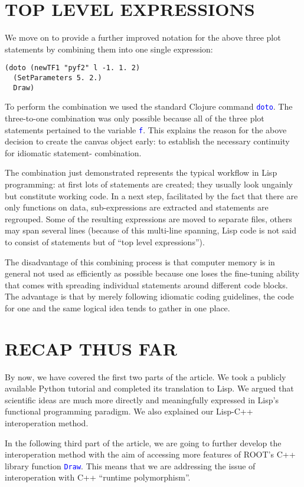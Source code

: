\documentclass{IEEEcsmag}
\begin{document}
\section{TOP LEVEL EXPRESSIONS}
We move on to provide a further improved notation for the above three plot statements by combining them into one single expression:
{\color{blue} \begin{verbatim}
(doto (newTF1 "pyf2" l -1. 1. 2)
  (SetParameters 5. 2.)
  Draw)
\end{verbatim}}
To perform the combination we used the standard Clojure command \texttt{\textcolor{blue}{doto}}. The three-to-one combination was only possible because all of the three plot statements pertained to the variable \texttt{\textcolor{blue}{f}}. This explains the reason for the above decision to create the canvas object early: to establish the necessary continuity for idiomatic statement- combination.

The combination just demonstrated represents the typical workflow in Lisp programming: at first lots of statements are created; they usually look ungainly but constitute working code. In a next step, facilitated by the fact that there are only functions on data, sub-expressions are extracted and statements are regrouped. Some of the resulting expressions are moved to separate files, others may span several lines (because of this multi-line spanning, Lisp code is not said to consist of statements but of “top level expressions”).

The disadvantage of this combining process is that computer memory is in general not used as efficiently as possible because one loses the fine-tuning ability that comes with spreading individual statements around different code blocks. The advantage is that by merely following idiomatic coding guidelines, the code for one and the same logical idea tends to gather in one place.\vspace*{-5pt}

\section{RECAP THUS FAR}
By now, we have covered the first two parts of the article. We took a publicly available Python tutorial and completed its translation to Lisp. We argued that scientific ideas are much more directly and meaningfully expressed in Lisp’s functional programming paradigm. We also explained our Lisp-C++ interoperation method.

In the following third part of the article, we are going to further develop the interoperation method with the aim of accessing more features of ROOT’s C++ library function \texttt{\textcolor{blue}{Draw}}. This means that we are addressing the issue of interoperation with C++ “runtime polymorphism”.\vspace*{-5pt}
\end{document}
